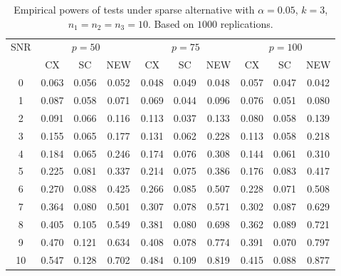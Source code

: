 \documentclass[review]{elsarticle}
\theoremstyle{plain}
\theoremstyle{definition}
\theoremstyle{remark}
\begin{document}
\begin{table}[!hbp]
    \caption{Empirical powers of tests under sparse alternative with $\alpha=0.05$, $k=3$, $n_1=n_2=n_3=10$. Based on $1000$ replications.}
\centering
\begin{tabular}{*{10}{c}}
\toprule
\multirow{2}{*}{SNR} &\multicolumn{3}{c}{$p=50$}&\multicolumn{3}{c}{$p=75$}&\multicolumn{3}{c}{$p=100$} \\
    \cmidrule(r){2-4}\cmidrule(r){5-7}\cmidrule(r){8-10}
        & CX & SC & NEW & CX &SC &NEW &CX & SC & NEW\\
\midrule
0 & 0.063 & 0.056 & 0.052 & 0.048 & 0.049 & 0.048 & 0.057 & 0.047 & 0.042 \\ 
1 & 0.087 & 0.058 & 0.071 & 0.069 & 0.044 & 0.096 & 0.076 & 0.051 & 0.080 \\ 
2 & 0.091 & 0.066 & 0.116 & 0.113 & 0.037 & 0.133 & 0.080 & 0.058 & 0.139 \\ 
3 & 0.155 & 0.065 & 0.177 & 0.131 & 0.062 & 0.228 & 0.113 & 0.058 & 0.218 \\ 
4 & 0.184 & 0.065 & 0.246 & 0.174 & 0.076 & 0.308 & 0.144 & 0.061 & 0.310 \\ 
5 & 0.225 & 0.081 & 0.337 & 0.214 & 0.075 & 0.386 & 0.176 & 0.083 & 0.417 \\ 
6 & 0.270 & 0.088 & 0.425 & 0.266 & 0.085 & 0.507 & 0.228 & 0.071 & 0.508 \\ 
7 & 0.364 & 0.080 & 0.501 & 0.307 & 0.078 & 0.571 & 0.302 & 0.087 & 0.629 \\ 
8 & 0.405 & 0.105 & 0.549 & 0.381 & 0.080 & 0.698 & 0.362 & 0.089 & 0.721 \\ 
9 & 0.470 & 0.121 & 0.634 & 0.408 & 0.078 & 0.774 & 0.391 & 0.070 & 0.797 \\ 
10 & 0.547 & 0.128 & 0.702 & 0.484 & 0.109 & 0.819 & 0.415 & 0.088 & 0.877 \\ 
\bottomrule
\end{tabular}
\end{table}
\end{document}
